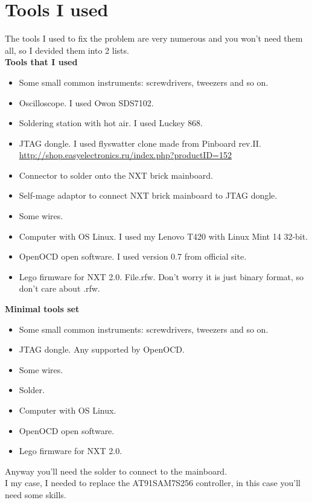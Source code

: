 \documentclass[11pt]{article}
\begin{document}
	\section{Tools I used}

		The tools I used to fix the problem are very numerous and you won't need them all, so I devided them into 2 lists.\\

		\textbf{Tools that I used}
		\begin{itemize}
			\item Some small common instruments: screwdrivers, tweezers and so on.
			\item Oscilloscope. I used Owon SDS7102.
			\item Soldering station with hot air. I used Luckey 868.
			\item JTAG dongle. I used flyswatter clone made from Pinboard rev.II. \url{http://shop.easyelectronics.ru/index.php?productID=152}\cite{easyelectronics_shop_pinboard}
			\item Connector to solder onto the NXT brick mainboard.
			\item Self-mage adaptor to connect NXT brick mainboard to JTAG dongle.
			\item Some wires.
			\item Computer with OS Linux. I used my Lenovo T420 with Linux Mint 14 32-bit.
			\item OpenOCD open software. I used version 0.7 from official site.
			\item Lego firmware for NXT 2.0. File.rfw. Don't worry it is just binary format, so don't care about .rfw.
		\end{itemize}
		
		\textbf{Minimal tools set}
		\begin{itemize}
			\item Some small common instruments: screwdrivers, tweezers and so on.
			\item JTAG dongle. Any supported by OpenOCD.
			\item Some wires.
			\item Solder.
			\item Computer with OS Linux.
			\item OpenOCD open software.
			\item Lego firmware for NXT 2.0.
		\end{itemize}
		Anyway you'll need the solder to connect to the mainboard.\\
		I my case, I needed to replace the AT91SAM7S256 controller, in this case you'll need some skills.
\end{document}
